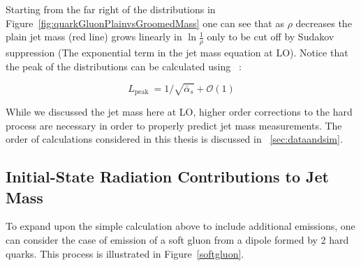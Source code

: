  Starting from the far right of the distributions in Figure~\ref{fig:quarkGluonPlainvsGroomedMass} one can see that as $\rho$ decreases the plain jet mass (red line) grows linearly in $\ln \frac{1}{\rho}$ only to be cut off by Sudakov suppression (The exponential term in the jet mass equation at LO). Notice that the peak of the distributions can be calculated using ~\cite{mmdt}:\newline

\begin{equation}
L_{\text {peak }}=1 / \sqrt{\bar{\alpha}_{s}}+\mathcal{O}(1)
\end{equation}
 


While we discussed the jet mass here at LO, higher order corrections to the hard process are necessary in order to properly predict jet mass measurements. The order of calculations considered in this thesis is discussed in ~\ref{sec:dataandsim}.









\subsection{Initial-State Radiation Contributions to Jet Mass }\label{sec:jetmassISR}


To expand upon the simple calculation above to include additional emissions, one can consider the case of emission of a soft gluon from a dipole formed by 2 hard quarks. This process is illustrated in Figure~\ref{softgluon}.



